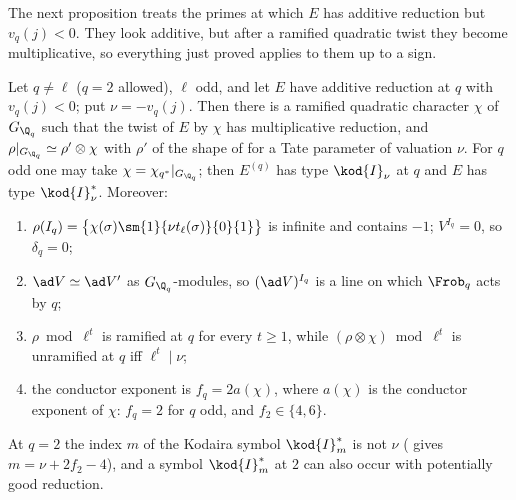 The next proposition treats the primes at which $E$ has additive reduction but $v_q(j)<0$. They look additive, but after a ramified quadratic twist they
become multiplicative, so everything just proved applies to them up to a sign.

\begin{proposition}\label{prop:galrep:potmult}
Let $q\ne\ell$ ($q=2$ allowed), $\ell$ odd, and let $E$ have additive reduction at $q$ with $v_q(j)<0$; put $\nu=-v_q(j)$. Then there is a ramified
quadratic character $\chi$ of $G_{\Q_q}$ such that the twist of $E$ by $\chi$ has multiplicative reduction, and $\rho|_{G_{\Q_q}}\simeq\rho'\otimes\chi$ with
$\rho'$ of the shape of  for a Tate parameter of valuation $\nu$. For $q$ odd one may take $\chi=\chi_{q^*}|_{G_{\Q_q}}$; then
$E^{(q)}$ has type $\kod{I}_\nu$ at $q$ and $E$ has type $\kod{I}_\nu^*$. Moreover:
\begin{enumerate}[label=(\roman*)]
\item $\rho(I_q)=\bigl\{\chi(\sigma)\sm{1}{\nu t_\ell(\sigma)}{0}{1}\bigr\}$ is infinite and contains $-1$; $V^{I_q}=0$, so $\delta_q=0$;
\item $\ad V\simeq\ad V'$ as $G_{\Q_q}$-modules, so $(\ad V)^{I_q}$ is a line on which $\Frob_q$ acts by $q$;
\item $\rho\bmod\ell^t$ is ramified at $q$ for every $t\ge1$, while $(\rho\otimes\chi)\bmod\ell^t$ is unramified at $q$ iff $\ell^t\mid\nu$;
\item the conductor exponent is $f_q=2a(\chi)$, where $a(\chi)$ is the conductor exponent of $\chi$: $f_q=2$ for $q$ odd, and $f_2\in\{4,6\}$.
\end{enumerate}
At $q=2$ the index $m$ of the Kodaira symbol $\kod{I}_m^*$ is not $\nu$ ( gives $m=\nu+2f_2-4$), and a symbol $\kod{I}_m^*$ at $2$ can also
occur with potentially good reduction.
\end{proposition}

